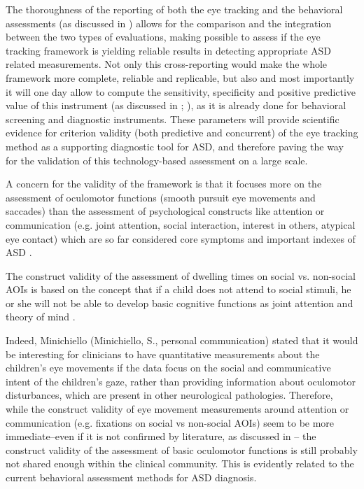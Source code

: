 The thoroughness of the reporting of both the eye tracking and the behavioral assessments (as discussed in ) allows for the comparison and the integration between the two types of evaluations, making possible to assess if the eye tracking framework is yielding reliable results in detecting appropriate ASD related measurements. Not only this cross-reporting would make the whole framework more complete, reliable and replicable, but also and most importantly it will one day allow to compute the sensitivity, specificity and positive predictive value of this instrument (as discussed in ; \citealp{charman2013measuerement}), as it is already done for behavioral screening and diagnostic instruments. These parameters will provide scientific evidence for criterion validity (both predictive and concurrent) of the eye tracking method as a supporting diagnostic tool for ASD, and therefore paving the way for the validation of this technology-based assessment on a large scale.

A concern for the validity of the framework is that it focuses more on the assessment of oculomotor functions (smooth pursuit eye movements and saccades) than the assessment of psychological constructs like attention or communication (e.g. joint attention, social interaction, interest in others, atypical eye contact) which are so far considered core symptoms and important indexes of ASD \citep{maganto2017screening}.

The construct validity of the assessment of dwelling times on social vs. non-social AOIs is based on the concept that if a child does not attend to social stimuli, he or she will not be able to develop basic cognitive functions as joint attention and theory of mind \citep{vonhofsten2009lookingevents}.

Indeed, Minichiello (Minichiello, S., personal communication) stated that it would be interesting for clinicians to have quantitative measurements about the children’s eye movements if the data focus on the social and communicative intent of the children’s gaze, rather than providing information about oculomotor disturbances, which are present in other neurological pathologies. Therefore, while the construct validity of eye movement measurements around attention or communication (e.g. fixations on social vs non-social AOIs) seem to be more immediate–even if it is not confirmed by literature, as discussed in – the construct validity of the assessment of basic oculomotor functions is still probably not shared enough within the clinical community. This is evidently related to the current behavioral assessment methods for ASD diagnosis.

